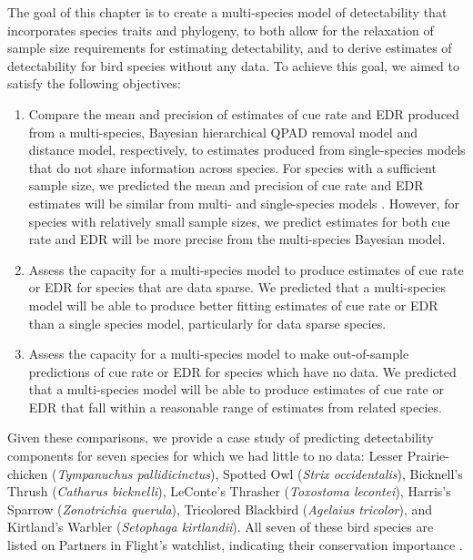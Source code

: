 \par The goal of this chapter is to create a multi-species model of detectability that incorporates species traits and phylogeny, to both allow for the relaxation of sample size requirements for estimating detectability, and to derive estimates of detectability for bird species without any data.
To achieve this goal, we aimed to satisfy the following objectives:
\begin{enumerate}
	\item Compare the mean and precision of estimates of cue rate and EDR produced from a multi-species, Bayesian hierarchical QPAD removal model and distance model, respectively, to estimates produced from single-species models that do not share information across species.
	For species with a sufficient sample size, we predicted the mean and precision of cue rate and EDR estimates will be similar from multi- and single-species models \citep{edwards_point_2023}.
	However, for species with relatively small sample sizes, we predict estimates for both cue rate and EDR will be more precise from the multi-species Bayesian model.
	\item Assess the capacity for a multi-species model to produce estimates of cue rate or EDR for species that are data sparse.
	We predicted that a multi-species model will be able to produce better fitting estimates of cue rate or EDR than a single species model, particularly for data sparse species.
	\item Assess the capacity for a multi-species model to make out-of-sample predictions of cue rate or EDR for species which have no data.
	We predicted that a multi-species model will be able to produce estimates of cue rate or EDR that fall within a reasonable range of estimates from related species.
\end{enumerate}

Given these comparisons, we provide a case study of predicting detectability components for seven species for which we had little to no data: Lesser Prairie-chicken (\textit{Tympanuchus pallidicinctus}), Spotted Owl (\textit{Strix occidentalis}), Bicknell’s Thrush (\textit{Catharus bicknelli}), LeConte’s Thrasher (\textit{Toxostoma lecontei}), Harris’s Sparrow (\textit{Zonotrichia querula}), Tricolored Blackbird (\textit{Agelaius tricolor}), and Kirtland’s Warbler (\textit{Setophaga kirtlandii}). 	
All seven of these bird species are listed on Partners in Flight’s watchlist, indicating their conservation importance \citep{will_handbook_2020}. 	


